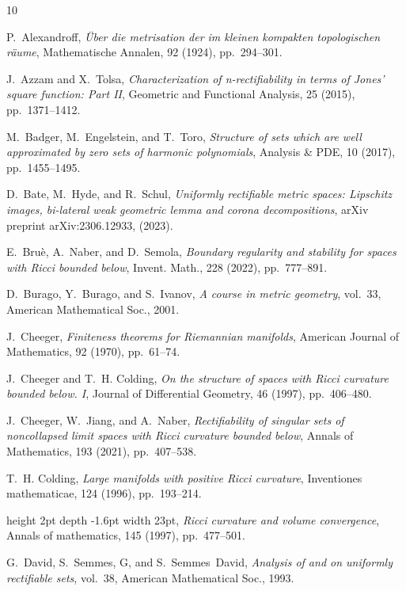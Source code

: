 \documentclass[11pt]{article}
\theoremstyle{plain}
\theoremstyle{definition}
\numberwithin{equation}{section}
\begin{document}
\begin{thebibliography}{10}

{\sc P.~Alexandroff}, {\em {\"U}ber die metrisation der im kleinen kompakten
  topologischen r{\"a}ume}, Mathematische Annalen, 92 (1924), pp.~294--301.

{\sc J.~Azzam and X.~Tolsa}, {\em Characterization of n-rectifiability in terms
  of {J}ones’ square function: {P}art {II}}, Geometric and Functional
  Analysis, 25 (2015), pp.~1371--1412.

{\sc M.~Badger, M.~Engelstein, and T.~Toro}, {\em Structure of sets which are
  well approximated by zero sets of harmonic polynomials}, Analysis \& PDE, 10
  (2017), pp.~1455--1495.

{\sc D.~Bate, M.~Hyde, and R.~Schul}, {\em Uniformly rectifiable metric spaces:
  {L}ipschitz images, bi-lateral weak geometric lemma and corona
  decompositions}, arXiv preprint arXiv:2306.12933,  (2023).

{\sc E.~Bru\`e, A.~Naber, and D.~Semola}, {\em Boundary regularity and
  stability for spaces with {R}icci bounded below}, Invent. Math., 228 (2022),
  pp.~777--891.

{\sc D.~Burago, Y.~Burago, and S.~Ivanov}, {\em A course in metric geometry},
  vol.~33, American Mathematical Soc., 2001.

{\sc J.~Cheeger}, {\em Finiteness theorems for {R}iemannian manifolds},
  American Journal of Mathematics, 92 (1970), pp.~61--74.

{\sc J.~Cheeger and T.~H. Colding}, {\em On the structure of spaces with
  {R}icci curvature bounded below. {I}}, Journal of Differential Geometry, 46
  (1997), pp.~406--480.

{\sc J.~Cheeger, W.~Jiang, and A.~Naber}, {\em Rectifiability of singular sets
  of noncollapsed limit spaces with {R}icci curvature bounded below}, Annals of
  Mathematics, 193 (2021), pp.~407--538.

{\sc T.~H. Colding}, {\em Large manifolds with positive {R}icci curvature},
  Inventiones mathematicae, 124 (1996), pp.~193--214.

\leavevmode\vrule height 2pt depth -1.6pt width 23pt, {\em Ricci curvature and
  volume convergence}, Annals of mathematics, 145 (1997), pp.~477--501.

{\sc G.~David, S.~Semmes, G, and S.~Semmes~David}, {\em Analysis of and on
  uniformly rectifiable sets}, vol.~38, American Mathematical Soc., 1993.


\end{thebibliography}
\end{document}
